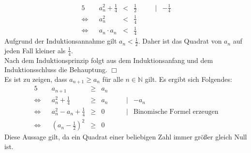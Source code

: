 \documentclass[10pt,a4paper,oneside,ngerman,numbers=noenddot]{scrartcl}
\begin{document}
\begin{alignat*}{5}
&& a_{n}^{2} + \frac{1}{4} &<& \frac{1}{2} && \;&|& -\frac{1}{4} \\
\Leftrightarrow && a_{n}^{2} &<& \frac{1}{4} && && \\
\Leftrightarrow && a_{n} \cdot a_{n} &<& \frac{1}{4} && &&
\end{alignat*}
Aufgrund der Induktionsannahme gilt $a_{n} < \frac{1}{2}$. Daher ist das Quadrat von $a_{n}$ auf jeden Fall kleiner als $\frac{1}{4}$.\\
Nach dem Induktionsprinzip folgt aus dem Induktionsanfang und dem Induktionsschluss die Behauptung. \hfill $\Box$\\
Es ist zu zeigen, dass $a_{n+1} \geq a_{n}$ für alle $n \in \mathbb{N}$ gilt. Es ergibt sich Folgendes:\\
\begin{alignat*}{5}
&& a_{n+1} &\geq & a_{n} && && \\
\Leftrightarrow && a_{n}^{2} + \frac{1}{4} &\geq & a_{n} && \;&|& -a_{n} \\
\Leftrightarrow && a_{n}^{2} - a_{n} + \frac{1}{4} &\geq & 0 && \;&|& \text{Binomische Formel erzeugen} \\
\Leftrightarrow && (a_{n} - \frac{1}{2})^{2} &\geq & 0 && &&
\end{alignat*}
Diese Aussage gilt, da ein Quadrat einer beliebigen Zahl immer größer gleich Null ist.
\end{document}
